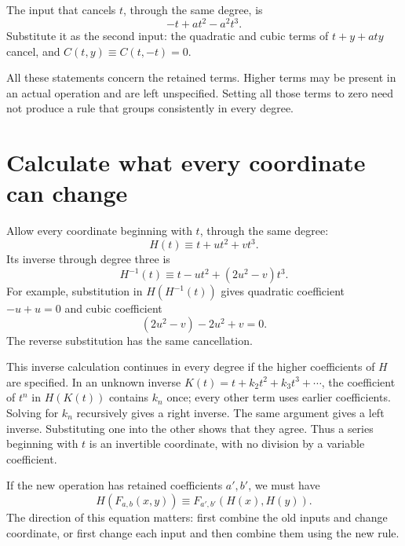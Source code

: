 The input that cancels \(t\), through the same degree, is
\[
 -t+at^2-a^2t^3.
\]
Substitute it as the second input: the quadratic and cubic terms of \(t+y+a ty\) cancel, and \(C(t,y)\equiv C(t,-t)=0\).

All these statements concern the retained terms. Higher terms may be present in an actual operation and are left unspecified. Setting all those terms to zero need not produce a rule that groups consistently in every degree.

\section{Calculate what every coordinate can change}\label{sec:coordinate-action}

Allow every coordinate beginning with \(t\), through the same degree:
\begin{equation}\label{eq:coordinate-jet}
 H(t)\equiv t+ut^2+vt^3.
\end{equation}
Its inverse through degree three is
\begin{equation}\label{eq:coordinate-inverse}
 H^{-1}(t)\equiv t-ut^2+(2u^2-v)t^3.
\end{equation}
For example, substitution in \(H(H^{-1}(t))\) gives quadratic coefficient \(-u+u=0\) and cubic coefficient
\[
 (2u^2-v)-2u^2+v=0.
\]
The reverse substitution has the same cancellation.

This inverse calculation continues in every degree if the higher coefficients of \(H\) are specified. In an unknown inverse \(K(t)=t+k_2t^2+k_3t^3+\cdots\), the coefficient of \(t^n\) in \(H(K(t))\) contains \(k_n\) once; every other term uses earlier coefficients. Solving for \(k_n\) recursively gives a right inverse. The same argument gives a left inverse. Substituting one into the other shows that they agree. Thus a series beginning with \(t\) is an invertible coordinate, with no division by a variable coefficient.

If the new operation has retained coefficients \(a',b'\), we must have
\begin{equation}\label{eq:coordinate-bridge}
 H(F_{a,b}(x,y))\equiv F_{a',b'}(H(x),H(y)).
\end{equation}
The direction of this equation matters: first combine the old inputs and change coordinate, or first change each input and then combine them using the new rule.

